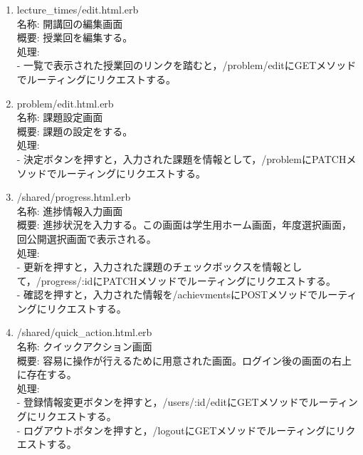 \begin{enumerate}
\item lecture\_times/edit.html.erb\\
名称:
開講回の編集画面\\
概要:
授業回を編集する。\\
処理:\\
- 一覧で表示された授業回のリンクを踏むと，/problem/editにGETメソッドでルーティングにリクエストする。

\item problem/edit.html.erb\\
名称:
課題設定画面\\
概要:
課題の設定をする。\\
処理:\\
- 決定ボタンを押すと，入力された課題を情報として，/problemにPATCHメソッドでルーティングにリクエストする。


\item /shared/progress.html.erb\\
名称:
進捗情報入力画面\\
概要:
進捗状況を入力する。この画面は学生用ホーム画面，年度選択画面，回公開選択画面で表示される。\\
処理:\\
- 更新を押すと，入力された課題のチェックボックスを情報として，/progress/:idにPATCHメソッドでルーティングにリクエストする。\\
- 確認を押すと，入力された情報を/achievmentsにPOSTメソッドでルーティングにリクエストする。

\item /shared/quick\_action.html.erb\\
名称:
クイックアクション画面\\
概要:
容易に操作が行えるために用意された画面。ログイン後の画面の右上に存在する。\\
処理:\\
- 登録情報変更ボタンを押すと，/users/:id/editにGETメソッドでルーティングにリクエストする。\\
- ログアウトボタンを押すと，/logoutにGETメソッドでルーティングにリクエストする。
\end{enumerate}


